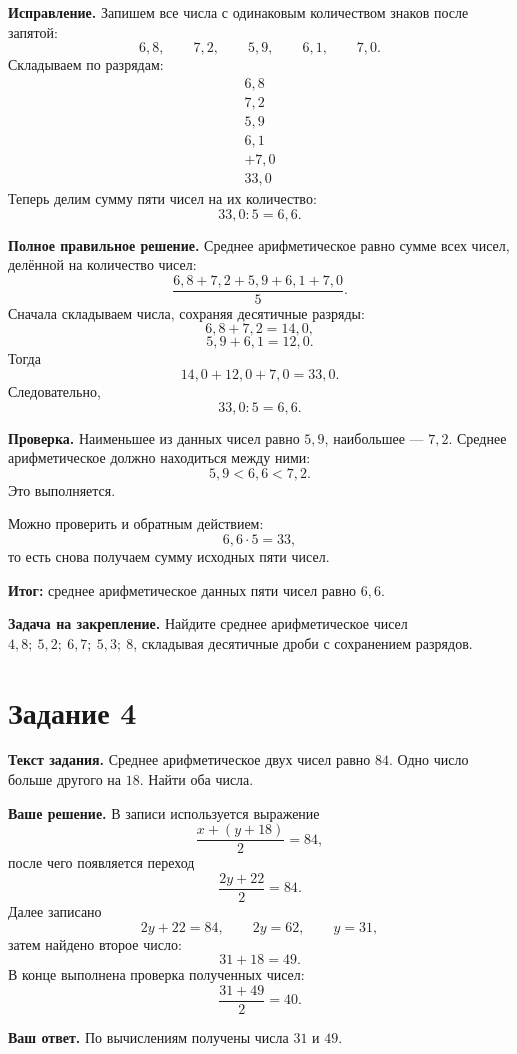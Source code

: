 \documentclass[12pt,a4paper]{article}
\begin{document}
\textbf{Исправление.}
Запишем все числа с одинаковым количеством знаков после запятой:
\[
6{,}8,\qquad
7{,}2,\qquad
5{,}9,\qquad
6{,}1,\qquad
7{,}0.
\]
Складываем по разрядам:
\[
\begin{array}{r}
  6{,}8\\
  7{,}2\\
  5{,}9\\
  6{,}1\\
+ 7{,}0\\
\hline
 33{,}0
\end{array}
\]
Теперь делим сумму пяти чисел на их количество:
\[
33{,}0:5=6{,}6.
\]

\textbf{Полное правильное решение.}
Среднее арифметическое равно сумме всех чисел, делённой на количество чисел:
\[
\frac{6{,}8+7{,}2+5{,}9+6{,}1+7{,}0}{5}.
\]
Сначала складываем числа, сохраняя десятичные разряды:
\[
6{,}8+7{,}2=14{,}0,
\]
\[
5{,}9+6{,}1=12{,}0.
\]
Тогда
\[
14{,}0+12{,}0+7{,}0=33{,}0.
\]
Следовательно,
\[
33{,}0:5=6{,}6.
\]

\textbf{Проверка.}
Наименьшее из данных чисел равно $5{,}9$, наибольшее --- $7{,}2$. Среднее арифметическое должно находиться между ними:
\[
5{,}9<6{,}6<7{,}2.
\]
Это выполняется.

Можно проверить и обратным действием:
\[
6{,}6\cdot5=33,
\]
то есть снова получаем сумму исходных пяти чисел.

\textcolor{teal!60!black}{\textbf{Итог:}} среднее арифметическое данных пяти чисел равно $6{,}6$.

\textbf{Задача на закрепление.} Найдите среднее арифметическое чисел $4{,}8;\ 5{,}2;\ 6{,}7;\ 5{,}3;\ 8$, складывая десятичные дроби с сохранением разрядов.

\newpage
{}\label{task:4}
\section*{Задание 4}

\textbf{Текст задания.} Среднее арифметическое двух чисел равно $84$. Одно число больше другого на $18$. Найти оба числа.

\textbf{Ваше решение.}
В записи используется выражение
\[
\frac{x+(y+18)}{2}=84,
\]
после чего появляется переход
\[
\frac{2y+22}{2}=84.
\]
Далее записано
\[
2y+22=84,\qquad 2y=62,\qquad y=31,
\]
затем найдено второе число:
\[
31+18=49.
\]
В конце выполнена проверка полученных чисел:
\[
\frac{31+49}{2}=40.
\]

\textbf{Ваш ответ.} По вычислениям получены числа $31$ и $49$.
\end{document}
